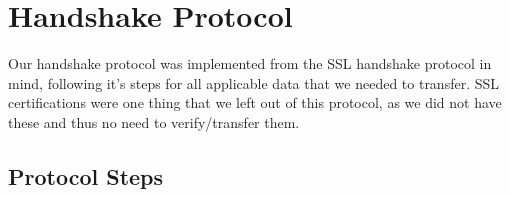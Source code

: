 \documentclass{article}
\begin{document}
\section{Handshake Protocol}\label{sec:handshake}
	Our handshake protocol was implemented from the SSL handshake protocol in mind, following it's steps for all applicable data that we needed to transfer. SSL certifications were one thing that we left out of this protocol, as we did not have these and thus no need to verify/transfer them.
	
	\subsection{Protocol Steps}\label{sec:protocolsteps}
\end{document}
